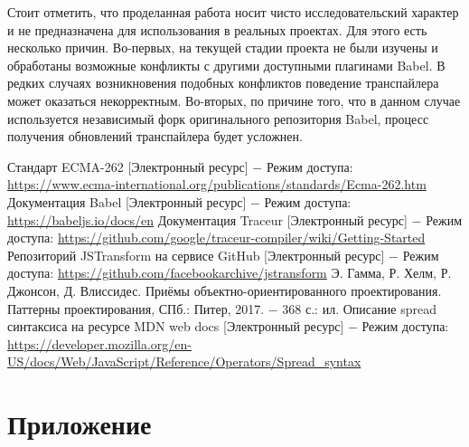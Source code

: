 \documentclass[14pt, a4paper]{article}
\begin{document}
Стоит отметить, что проделанная работа носит чисто исследовательский характер и не предназначена для 
использования в реальных проектах. Для этого есть несколько причин. Во-первых, на текущей стадии 
проекта не были изучены и обработаны возможные конфликты с другими доступными плагинами Babel. В 
редких случаях возникновения подобных конфликтов поведение транспайлера может оказаться некорректным. 
Во-вторых, по причине того, что в данном случае используется независимый форк оригинального репозитория 
Babel, процесс получения обновлений транспайлера будет усложнен.

\pagebreak

\begin{thebibliography}{9}
   Стандарт ECMA-262 [Электронный ресурс] $-$ Режим доступа: \linebreak
    \url{https://www.ecma-international.org/publications/standards/Ecma-262.htm}
   Документация Babel [Электронный ресурс] $-$ Режим доступа: \linebreak
    \url{https://babeljs.io/docs/en}
   Документация Traceur [Электронный ресурс] $-$ Режим доступа: \linebreak
    \url{https://github.com/google/traceur-compiler/wiki/Getting-Started}
   Репозиторий JSTransform на сервисе GitHub [Электронный ресурс] $-$ Режим доступа:
    \url{https://github.com/facebookarchive/jstransform}
   Э. Гамма, Р. Хелм, Р. Джонсон, Д. Влиссидес. Приёмы объектно-ориентированного проектирования. Паттерны проектирования, СПб.: Питер, 2017. $-$ 368 с.: ил.
   Описание spread синтаксиса на ресурсе MDN web docs [Электронный ресурс] $-$ Режим доступа:
    \url{https://developer.mozilla.org/en-US/docs/Web/JavaScript/Reference/Operators/Spread_syntax}
\end{thebibliography}

\pagebreak
{}
\section*{Приложение}

\end{document}
